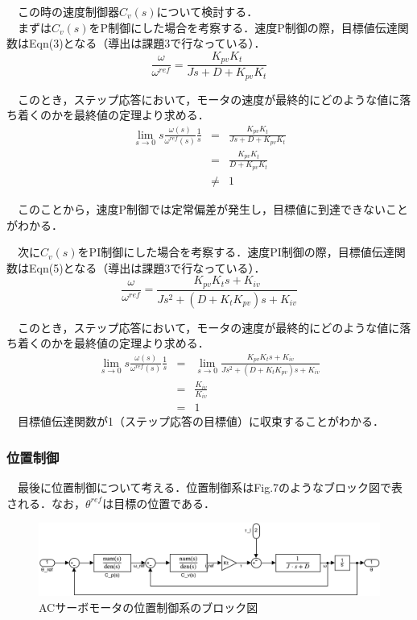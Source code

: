 　この時の速度制御器$C_v(s)$について検討する．\\
　まずは$C_v(s)$をP制御にした場合を考察する．速度P制御の際，目標値伝達関数はEqn(3)となる（導出は課題3で行なっている）．
\begin{equation}
    \frac{\omega}{\omega^{ref}} = \frac{K_{pv} K_t}{Js + D + K_{pv} K_t}
\end{equation}

　このとき，ステップ応答において，モータの速度が最終的にどのような値に落ち着くのかを最終値の定理より求める．
\begin{eqnarray}
    \lim_{s \to 0} s \frac{\omega(s)}{\omega^{ref}(s)} \frac{1}{s} &=& \frac{K_{pv} K_t}{Js + D + K_{pv} K_t}\nonumber \\
    &=& \frac{K_{pv} K_t}{D + K_{pv} K_t} \nonumber \\
    &\neq& 1
\end{eqnarray}

　このことから，速度P制御では定常偏差が発生し，目標値に到達できないことがわかる．

　次に$C_v(s)$をPI制御にした場合を考察する．速度PI制御の際，目標値伝達関数はEqn(5)となる（導出は課題3で行なっている）．
\begin{equation}
    \frac{\omega}{\omega^{ref}} = \frac{K_{pv}K_ts + K_{iv}}{Js^2 + \left(D+K_tK_{pv}\right)s + K_{iv}}
\end{equation}

　このとき，ステップ応答において，モータの速度が最終的にどのような値に落ち着くのかを最終値の定理より求める．
\begin{eqnarray}
    \lim_{s \to 0} s \frac{\omega(s)}{\omega^{ref}(s)} \frac{1}{s} &=& \lim_{s \to 0} \frac{K_{pv}K_ts + K_{iv}}{Js^2 + \left(D+K_tK_{pv}\right)s + K_{iv}} \nonumber \\
    &=& \frac{K_{iv}}{K_{iv}} \nonumber \\
    &=& 1
\end{eqnarray}
　目標値伝達関数が1（ステップ応答の目標値）に収束することがわかる．\\


\subsubsection{位置制御}
　最後に位置制御について考える．位置制御系はFig.7のようなブロック図で表される．なお，$\theta^{ref}$は目標の位置である．
\begin{figure}[H]
    \centering
    \includegraphics[width=15cm]{./fig/fig7.pdf}
    \caption{ACサーボモータの位置制御系のブロック図}
\end{figure}

